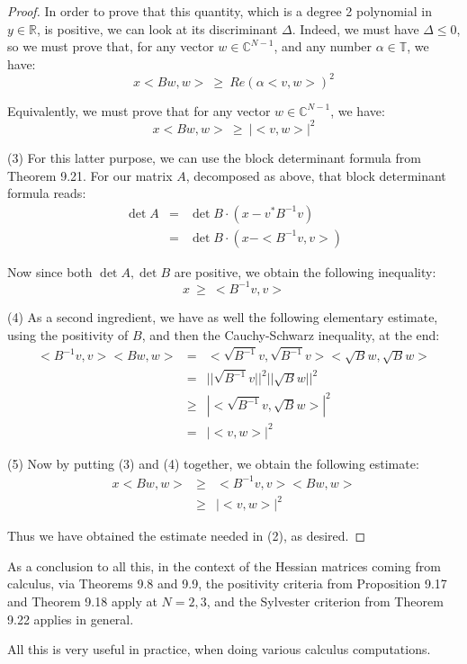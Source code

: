 \documentclass[12pt]{amsbook}
\begin{document}
\begin{proof}
In order to prove that this quantity, which is a degree 2 polynomial in $y\in\mathbb R$, is positive, we can look at its discriminant $\Delta$. Indeed, we must have $\Delta\leq0$, so we must prove that, for any vector $w\in\mathbb C^{N-1}$, and any number $\alpha\in\mathbb T$, we have:
$$x<Bw,w>\ \geq\ Re(\alpha<v,w>)^2$$

Equivalently, we must prove that for any vector $w\in\mathbb C^{N-1}$, we have:
$$x<Bw,w>\ \geq\ |<v,w>|^2$$

(3) For this latter purpose, we can use the block determinant formula from Theorem 9.21. For our matrix $A$, decomposed as above, that block determinant formula reads:
\begin{eqnarray*}
\det A
&=&\det B\cdot (x-v^*B^{-1}v)\\
&=&\det B\cdot (x-<B^{-1}v,v>)
\end{eqnarray*}

Now since both $\det A,\det B$ are positive, we obtain the following inequality:
$$x\ \geq\ <B^{-1}v,v>$$

(4) As a second ingredient, we have as well the following elementary estimate, using the positivity of $B$, and then the Cauchy-Schwarz inequality, at the end:
\begin{eqnarray*}
<B^{-1}v,v><Bw,w>
&=&<\sqrt{B^{-1}}v,\sqrt{B^{-1}}v><\sqrt{B}w,\sqrt{B}w>\\
&=&||\sqrt{B^{-1}}v||^2||\sqrt{B}w||^2\\
&\geq&|<\sqrt{B^{-1}}v,\sqrt{B}w>|^2\\
&=&|<v,w>|^2
\end{eqnarray*}

(5) Now by putting (3) and (4) together, we obtain the following estimate:
\begin{eqnarray*}
x<Bw,w>
&\geq&<B^{-1}v,v><Bw,w>\\
&\geq&|<v,w>|^2
\end{eqnarray*}

Thus we have obtained the estimate needed in (2), as desired.
\end{proof}

As a conclusion to all this, in the context of the Hessian matrices coming from calculus, via Theorems 9.8 and 9.9, the positivity criteria from Proposition 9.17 and Theorem 9.18 apply at $N=2,3$, and the Sylvester criterion from Theorem 9.22 applies in general. 

\bigskip

All this is very useful in practice, when doing various calculus computations.
\end{document}
